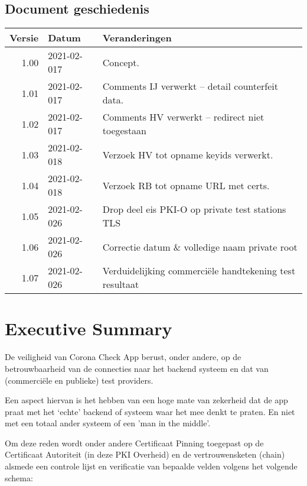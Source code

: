 \documentclass[11.0pt,twoside,openright]{report}
\begin{document}

\maketitle

\section*{Document geschiedenis}

\begin{tabular}{|r|l|l|}
\hline
Versie & Datum & Veranderingen \\
\hline
\hline
1.00 & 2021-02-017 & Concept. \\
\hline
1.01 & 2021-02-017 & Comments IJ verwerkt -- detail counterfeit data.\\
\hline
1.02 & 2021-02-017 & Comments HV verwerkt -- redirect niet toegestaan \\
\hline
1.03 & 2021-02-018 & Verzoek HV tot opname keyids verwerkt.  \\
\hline
1.04 & 2021-02-018 & Verzoek RB tot opname URL met certs.  \\
\hline
1.05 & 2021-02-026 & Drop deel eis PKI-O op private test stations TLS \\
\hline
1.06 & 2021-02-026 & Correctie datum \& volledige naam private root \\
\hline
1.07 & 2021-02-026 & Verduidelijking commerciële handtekening test resultaat \\
\hline
\end{tabular}


\pagebreak
\chapter{Executive Summary}

De veiligheid van Corona Check App berust, onder andere, op de betrouwbaarheid van de connecties naar het backend systeem en dat van (commerciële en publieke) test providers.

Een aspect hiervan is het hebben van een hoge mate van zekerheid dat de app praat met het `echte' backend of systeem waar het mee denkt te praten. En niet met een totaal ander systeem of een 'man in the middle'.

Om deze reden wordt onder andere Certificaat Pinning toegepast op de Certificaat Autoriteit (in deze PKI Overheid) en de vertrouwensketen (chain) alsmede een controle lijst en verificatie van bepaalde velden volgens het volgende schema:
\end{document}
